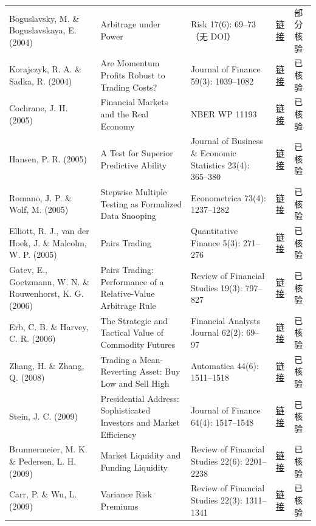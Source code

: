 \begin{longtable}{@{}>{\raggedright\arraybackslash}p{2.55cm}>{\raggedright\arraybackslash}p{4.7cm}>{\raggedright\arraybackslash}p{2.7cm}>{\raggedright\arraybackslash}p{1.9cm}>{\raggedright\arraybackslash}p{1.45cm}@{}}
Boguslavsky, M. \& Boguslavskaya, E. (2004) & Arbitrage under Power & Risk 17(6): 69--73（无 DOI） & \href{https://www.risk.net/}{链接} & 部分核验 \\
Korajczyk, R. A. \& Sadka, R. (2004) & Are Momentum Profits Robust to Trading Costs? & Journal of Finance 59(3): 1039--1082 & \href{https://doi.org/10.1111/j.1540-6261.2004.00656.x}{链接} & 已核验 \\
Cochrane, J. H. (2005) & Financial Markets and the Real Economy & NBER WP 11193 & \href{https://doi.org/10.3386/w11193}{链接} & 已核验 \\
Hansen, P. R. (2005) & A Test for Superior Predictive Ability & Journal of Business \& Economic Statistics 23(4): 365--380 & \href{https://doi.org/10.1198/073500105000000063}{链接} & 已核验 \\
Romano, J. P. \& Wolf, M. (2005) & Stepwise Multiple Testing as Formalized Data Snooping & Econometrica 73(4): 1237--1282 & \href{https://doi.org/10.1111/j.1468-0262.2005.00615.x}{链接} & 已核验 \\
Elliott, R. J., van der Hoek, J. \& Malcolm, W. P. (2005) & Pairs Trading & Quantitative Finance 5(3): 271--276 & \href{https://doi.org/10.1080/14697680500149370}{链接} & 已核验 \\
Gatev, E., Goetzmann, W. N. \& Rouwenhorst, K. G. (2006) & Pairs Trading: Performance of a Relative-Value Arbitrage Rule & Review of Financial Studies 19(3): 797--827 & \href{https://doi.org/10.1093/rfs/hhj020}{链接} & 已核验 \\
Erb, C. B. \& Harvey, C. R. (2006) & The Strategic and Tactical Value of Commodity Futures & Financial Analysts Journal 62(2): 69--97 & \href{https://doi.org/10.2469/faj.v62.n2.4084}{链接} & 已核验 \\
Zhang, H. \& Zhang, Q. (2008) & Trading a Mean-Reverting Asset: Buy Low and Sell High & Automatica 44(6): 1511--1518 & \href{https://doi.org/10.1016/j.automatica.2007.11.003}{链接} & 已核验 \\
Stein, J. C. (2009) & Presidential Address: Sophisticated Investors and Market Efficiency & Journal of Finance 64(4): 1517--1548 & \href{https://doi.org/10.1111/j.1540-6261.2009.01472.x}{链接} & 已核验 \\
Brunnermeier, M. K. \& Pedersen, L. H. (2009) & Market Liquidity and Funding Liquidity & Review of Financial Studies 22(6): 2201--2238 & \href{https://doi.org/10.1093/rfs/hhn098}{链接} & 已核验 \\
Carr, P. \& Wu, L. (2009) & Variance Risk Premiums & Review of Financial Studies 22(3): 1311--1341 & \href{https://doi.org/10.1093/rfs/hhn038}{链接} & 已核验 \\

\end{longtable}
